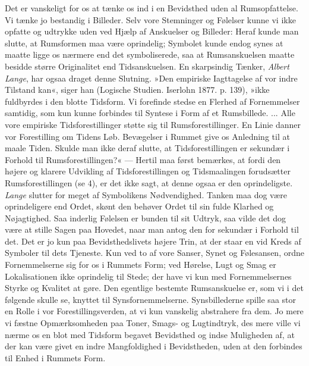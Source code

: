 \documentclass[12pt,a4paper,openany]{book}
\newcommand{\opage}[1]{\marginnote{\footnotesize\textit{[#1]}}}
\begin{document}
Det er vanskeligt for os at tænke os ind i en Bevidsthed uden al
Rumsopfattelse. Vi tænke jo bestandig i Billeder. Selv vore Stemninger
og Følelser kunne vi ikke opfatte og udtrykke uden ved Hjælp af
Anskuelser og Billeder: Heraf kunde man slutte, at Rumsformen maa være
oprindelig; Symbolet kunde endog synes at maatte ligge os nærmere end
det symboliserede, saa at Rumsanskuelsen maatte besidde større
Originalitet end Tidsanskuelsen. En skarpsindig Tænker, \emph{Albert
Lange}, har ogsaa draget denne Slutning. »Den empiriske Iagttagelse af
vor indre Tilstand kan«, siger han (Logische Studien. Iserlohn 1877. p.
139), »ikke fuldbyrdes i den blotte Tidsform. Vi forefinde stedse en
Flerhed af Fornemmelser samtidig, som kun kunne forbindes til Syntese i
Form af et Rumsbillede. ... Alle vore empiriske Tidsforestillinger
støtte sig til Rumsforestillinger. En Linie danner vor Forestilling om
Tidens Løb. Bevægelser i Rummet give os Anledning til at maale Tiden.
Skulde man ikke deraf slutte, at Tidsforestillingen er sekundær i
Forhold til Rumsforestillingen?« --- Hertil maa først bemærkes, at fordi
den højere og klarere Udvikling af Tidsforestillingen og Tidsmaalingen
forudsætter Rumsforestillingen (se 4), er det ikke sagt, at denne ogsaa
er den oprindeligste. \emph{Lange} slutter for meget af Symbolikens
Nødvendighed. Tanken maa dog være oprindeligere end Ordet, skønt den
behøver Ordet til sin fulde
\opage{236}Klarhed og Nøjagtighed. Saa inderlig Følelsen er bunden til
sit Udtryk, saa vilde det dog være at stille Sagen paa Hovedet, naar man
antog den for sekundær i Forhold til det. Det er jo kun paa
Bevidsthedslivets højere Trin, at der staar en vid Kreds af Symboler til
dets Tjeneste. Kun ved to af vore Sanser, Synet og Følesansen, ordne
Fornemmelserne sig for os i Rummets Form; ved Hørelse, Lugt og Smag er
Lokalisationen ikke oprindelig til Stede; der have vi kun med
Fornemmelsernes Styrke og Kvalitet at gøre. Den egentlige bestemte
Rumsanskuelse er, som vi i det følgende skulle se, knyttet til
Synsfornemmelserne. Synsbillederne spille saa stor en Rolle i vor
Forestillingsverden, at vi kun vanskelig abstrahere fra dem. Jo mere vi
fæstne Opmærksomheden paa Toner, Smags- og Lugtindtryk, des mere ville
vi nærme os en blot med Tidsform begavet Bevidsthed og indse Muligheden
af, at der kan være givet en indre Mangfoldighed i Bevidstheden, uden at
den forbindes til Enhed i Rummets Form.
\end{document}
